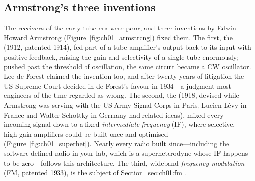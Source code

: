 
\subsection{Armstrong's three inventions}

The receivers of the early tube era were poor, and three inventions by Edwin Howard Armstrong
(Figure~\ref{fig:ch01_armstrong}) fixed them. The first, the  (1912,
patented 1914), fed part of a tube amplifier's output back to its input with positive feedback,
raising the gain and selectivity of a single tube enormously; pushed past the threshold of
oscillation, the same circuit became a CW oscillator. Lee de Forest claimed the invention too, and
after twenty years of litigation the US Supreme Court decided in de Forest's favour in 1934---a
judgment most engineers of the time regarded as wrong. The second, the  (1918, devised while Armstrong was serving with the US Army Signal Corps in Paris; Lucien
L\'evy in France and Walter Schottky in Germany had related ideas), mixed every incoming signal down to
a fixed \emph{intermediate frequency} (IF), where selective, high-gain amplifiers could be built once
and optimised (Figure~\ref{fig:ch01_superhet}). Nearly every radio built since---including the
software-defined radio in your lab, which is a superheterodyne whose IF happens to be zero---follows
this architecture. The third, wideband \emph{frequency modulation} (FM, patented 1933), is the
subject of Section~\ref{sec:ch01:fm}.

